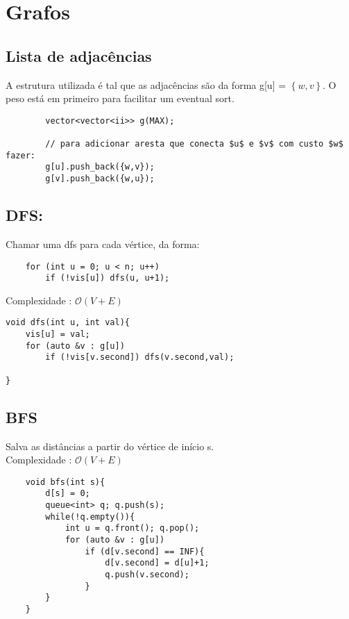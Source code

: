 \section{Grafos}

\subsection{Lista de adjacências} 

\par A estrutura utilizada é tal que as adjacências são da forma 
g[u] = $\left\{w,v\right\}$. 
O peso está em primeiro para facilitar um eventual sort.

\begin{verbatim}
        vector<vector<ii>> g(MAX);

        // para adicionar aresta que conecta $u$ e $v$ com custo $w$ fazer:
        g[u].push_back({w,v}); 
        g[v].push_back({w,u}); 
    \end{verbatim}

\subsection{DFS:}
\par Chamar uma dfs para cada vértice, da forma:
\begin{verbatim}
    for (int u = 0; u < n; u++) 
        if (!vis[u]) dfs(u, u+1);
\end{verbatim}
Complexidade : $\mathcal{O}(V+E)$
    \begin{verbatim}
void dfs(int u, int val){
    vis[u] = val;
    for (auto &v : g[u])
        if (!vis[v.second]) dfs(v.second,val);
    
}
    \end{verbatim}

\subsection{BFS}
\par Salva as distâncias a partir do vértice de início s.\\
\samepage
Complexidade : $\mathcal{O}(V+E)$
\begin{verbatim}
    void bfs(int s){
        d[s] = 0;
        queue<int> q; q.push(s);
        while(!q.empty()){
            int u = q.front(); q.pop();
            for (auto &v : g[u])
                if (d[v.second] == INF){
                    d[v.second] = d[u]+1;
                    q.push(v.second);
                }
        }
    }
    
\end{verbatim}


